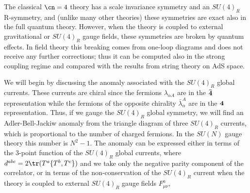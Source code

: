 The classical $\cn=4$ theory has a scale invariance symmetry and an
$SU(4)_R$ R-symmetry, and (unlike many other theories) these
symmetries are exact also in the full quantum theory. However, when
the theory is coupled to external gravitational or $SU(4)_R$ gauge
fields, these symmetries are broken by quantum effects. In field
theory this breaking comes from one-loop diagrams and does not receive
any further corrections; thus it can be computed also in the strong
coupling regime and compared with the results from string theory on
AdS space.

We will begin by discussing the anomaly associated with the $SU(4)_R$
global currents. These currents are chiral since the fermions
$\lambda_{\alpha A}$ are in the $\bf {\bar 4}$ representation while
the fermions of the opposite chirality ${\bar
\lambda}_{\dot{\alpha}}^A$ are in the $\bf 4$ representation. Thus, if
we gauge the $SU(4)_R$ global symmetry, we will find an
Adler-Bell-Jackiw anomaly from the triangle diagram of three $SU(4)_R$
currents, which is proportional to the number of charged fermions.
In the $SU(N)$ gauge theory this number is $N^2-1$. The anomaly can be
expressed either in terms of the 3-point function of the $SU(4)_R$
global currents, 
where 
$d^{abc} = 2\tr(T^a \{T^b, T^c\})$ and
we take only the negative parity component of the correlator, 
or in terms of the
non-conservation of the $SU(4)_R$ current when the theory is coupled to
external $SU(4)_R$ gauge fields $F_{\mu \nu}^a$,

